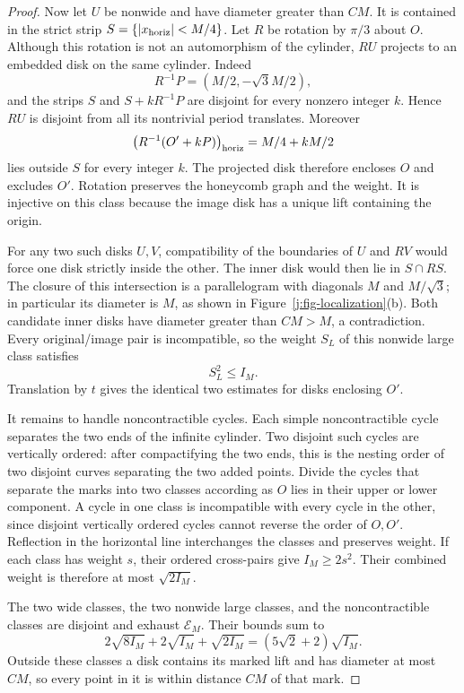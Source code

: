 \begin{proof}
Now let \(U\) be nonwide and have diameter greater than \(CM\). It is
contained in the strict strip \(S=\{|x_{\rm horiz}|<M/4\}\). Let \(R\)
be rotation by \(\pi/3\) about \(O\). Although this rotation is not an
automorphism of the cylinder, \(RU\) projects to an embedded disk on
the same cylinder. Indeed
\[
 R^{-1}P=(M/2,-\sqrt3M/2),
\]
and the strips \(S\) and \(S+kR^{-1}P\) are disjoint for every nonzero
integer \(k\). Hence \(RU\) is disjoint from all its nontrivial period
translates. Moreover
\[
 \bigl(R^{-1}(O'+kP)\bigr)_{\rm horiz}=M/4+kM/2
\]
lies outside \(S\) for every integer \(k\). The projected disk therefore
encloses \(O\) and excludes \(O'\). Rotation preserves the honeycomb
graph and the weight. It is injective on this class because the image
disk has a unique lift containing the origin.

For any two such disks \(U,V\), compatibility of the boundaries of
\(U\) and \(RV\) would force one disk strictly inside the other.
The inner disk would then lie in \(S\cap RS\). The closure of this
intersection is a parallelogram with diagonals \(M\) and \(M/\sqrt3\);
in particular its diameter is \(M\), as shown in
Figure~\ref{j:fig-localization}(b). Both candidate inner disks have
diameter greater than \(CM>M\), a contradiction. Every original/image
pair is incompatible, so the weight \(S_L\) of this nonwide large class
satisfies
\[
 S_L^2\le I_M.
\]
Translation by \(t\) gives the identical two estimates for disks
enclosing \(O'\).

It remains to handle noncontractible cycles. Each simple
noncontractible cycle separates the two ends of the infinite cylinder.
Two disjoint such cycles are vertically ordered: after compactifying
the two ends, this is the nesting order of two disjoint curves
separating the two added points. Divide the cycles that separate the
marks into two classes according as \(O\) lies in their upper or lower
component. A cycle in one class is incompatible with every cycle in
the other, since disjoint vertically ordered cycles cannot reverse the
order of \(O,O'\). Reflection in the horizontal line interchanges the
classes and preserves weight. If each class has weight \(s\), their
ordered cross-pairs give \(I_M\ge2s^2\). Their combined weight is
therefore at most \(\sqrt{2I_M}\).

The two wide classes, the two nonwide large classes, and the
noncontractible classes are disjoint and exhaust \(\mathcal E_M\).
Their bounds sum to
\[
 2\sqrt{8I_M}+2\sqrt{I_M}+\sqrt{2I_M}
   =(5\sqrt2+2)\sqrt{I_M}.
\]
Outside these classes a disk contains its marked lift and has diameter
at most \(CM\), so every point in it is within distance \(CM\) of that
mark.
\end{proof}

